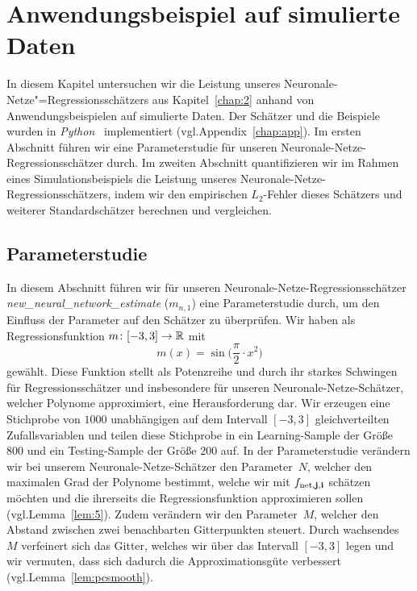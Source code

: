 \chapter{Anwendungsbeispiel auf simulierte Daten}
\label{chap:4}

In diesem Kapitel untersuchen wir die Leistung unseres Neuronale-Netze"=Regressionsschätzers aus Kapitel~\ref{chap:2} anhand von Anwendungsbeispielen auf simulierte Daten. Der Schätzer und die Beispiele wurden in \emph{Python}~\cite[Version 3.7.3]{van1995python} implementiert (vgl.\@ Appendix~\ref{chap:app}). 
Im ersten Abschnitt führen wir eine Parameterstudie für unseren Neuronale-Netze-Regressionsschätzer durch. Im zweiten Abschnitt quantifizieren wir im Rahmen eines Simulationsbeispiels die Leistung unseres Neuronale-Netze-Regressionsschätzers, indem wir den empirischen $L_2$-Fehler dieses Schätzers und weiterer Standardschätzer berechnen und vergleichen.

\section{Parameterstudie}
\label{Studie}

In diesem Abschnitt führen wir für unseren Neuronale-Netze-Regressionsschätzer \textit{new\_neural\_network\_estimate} ($m_{n,1}$) eine Parameterstudie durch, um den Einfluss der Parameter auf den Schätzer zu überprüfen. Wir haben als Regressionsfunktion $m\colon [-3,3] \to \mathbb{R}$ mit
$$m(x) = \sin\big(\frac{\pi}{2} \cdot x^2\big)$$
gewählt.
Diese Funktion stellt als Potenzreihe und durch ihr starkes Schwingen für Regressionsschätzer und insbesondere für unseren Neuronale-Netze-Schätzer, welcher Polynome approximiert, eine Herausforderung dar. Wir erzeugen eine Stichprobe von $1000$ unabhängigen auf dem Intervall $[-3,3]$ gleichverteilten Zufallsvariablen und teilen diese Stichprobe in ein Learning-Sample der Größe $800$ und ein Testing-Sample  der Größe $200$ auf. In der Parameterstudie verändern wir bei unserem Neuronale-Netze-Schätzer den Parameter~$N$, welcher den maximalen Grad der Polynome bestimmt, welche wir mit $f_{\mathrm{net},\mathbf{j},\mathbf{i}}$ schätzen möchten und die ihrerseits die Regressionsfunktion approximieren sollen (vgl.\@ Lemma~\ref{lem:5}). Zudem verändern wir den Parameter~$M$, welcher den Abstand zwischen zwei benachbarten Gitterpunkten steuert. Durch wachsendes $M$ verfeinert sich das Gitter, welches wir über das Intervall $[-3,3]$ legen und wir vermuten, dass sich dadurch die Approximationsgüte verbessert (vgl.\@ Lemma~\ref{lem:pcsmooth}). 

